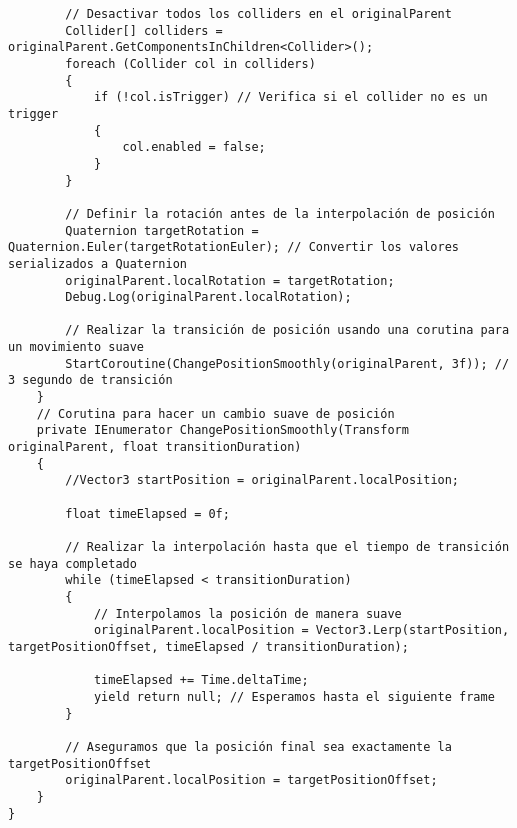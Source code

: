 \begin{verbatim}
        // Desactivar todos los colliders en el originalParent
        Collider[] colliders = originalParent.GetComponentsInChildren<Collider>();
        foreach (Collider col in colliders)
        {
            if (!col.isTrigger) // Verifica si el collider no es un trigger
            {
                col.enabled = false;
            }
        }

        // Definir la rotación antes de la interpolación de posición
        Quaternion targetRotation = Quaternion.Euler(targetRotationEuler); // Convertir los valores serializados a Quaternion
        originalParent.localRotation = targetRotation;
        Debug.Log(originalParent.localRotation);

        // Realizar la transición de posición usando una corutina para un movimiento suave
        StartCoroutine(ChangePositionSmoothly(originalParent, 3f)); // 3 segundo de transición
    }
    // Corutina para hacer un cambio suave de posición
    private IEnumerator ChangePositionSmoothly(Transform originalParent, float transitionDuration)
    {
        //Vector3 startPosition = originalParent.localPosition;

        float timeElapsed = 0f;

        // Realizar la interpolación hasta que el tiempo de transición se haya completado
        while (timeElapsed < transitionDuration)
        {
            // Interpolamos la posición de manera suave
            originalParent.localPosition = Vector3.Lerp(startPosition, targetPositionOffset, timeElapsed / transitionDuration);

            timeElapsed += Time.deltaTime;
            yield return null; // Esperamos hasta el siguiente frame
        }

        // Aseguramos que la posición final sea exactamente la targetPositionOffset
        originalParent.localPosition = targetPositionOffset;
    }
}
\end{verbatim}
\newpage
